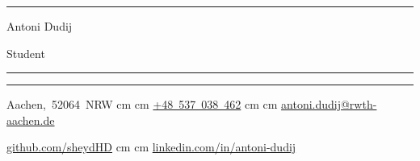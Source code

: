 \documentclass[11pt, letterpaper]{article}
\newenvironment{header}{
    \setlength{\topsep}{0pt}\par\kern\topsep\centering\linespread{0.3}
}{
    \par\kern\topsep
} %
\let\hrefWithoutArrow\href
\renewcommand{\href}[2]{\hrefWithoutArrow{#1}{\ifthenelse{\equal{#2}{}}{ }{#2 }\raisebox{.15ex}{\footnotesize \faExternalLink*}}}
\begin{document}
    \newcommand{\AND}{\unskip
        \cleaders\copy\ANDbox\hskip\wd\ANDbox
        \ignorespaces
    }
    \newsavebox\ANDbox
    \sbox\ANDbox{}

    \begin{header}
        \hrule
        \vspace{0.5cm}
        {\fontsize{30 pt}{30 pt}\selectfont Antoni Dudij}

        \vspace{0.2cm}
        {\fontsize{18 pt}{18pt}\selectfont Student}

        \vspace{0.4cm} %
        \normalsize
        {\color{black}\rule{\textwidth}{0.1pt}}
        \vspace{0.035cm} %
        {\color{black}\rule{\textwidth}{0.1pt}}

        \vspace{0.4cm}

        \mbox{{\color{black}\footnotesize\faMapMarker*}\hspace*{0.13cm}Aachen, 52064 NRW}  cm \textbullet {} cm
        \mbox{\hrefWithoutArrow{tel:+48-537-038-462}{\color{black}{\footnotesize\faPhone*}\hspace*{0.13cm}+48 537 038 462}}  cm \textbullet {} cm
        \mbox{\hrefWithoutArrow{mailto:antoni.dudij@rwth-aachen.de}{\color{black}{\footnotesize\faEnvelope[regular]}\hspace*{0.13cm}antoni.dudij@rwth-aachen.de}}

        \vspace{0.3cm}
        
        \mbox{\hrefWithoutArrow{https://github.com/sheydHD}{\color{black}{\footnotesize\faGithub}\hspace*{0.13cm}github.com/sheydHD}}  cm \textbullet {} cm
        \mbox{\hrefWithoutArrow{https://www.linkedin.com/in/antoni-dudij}{\color{black}{\footnotesize\faLinkedin}\hspace*{0.13cm}linkedin.com/in/antoni-dudij}}
    \end{header}

    \vspace{0.25 cm}


    
    
    
    
    
    
    
    
\end{document}
